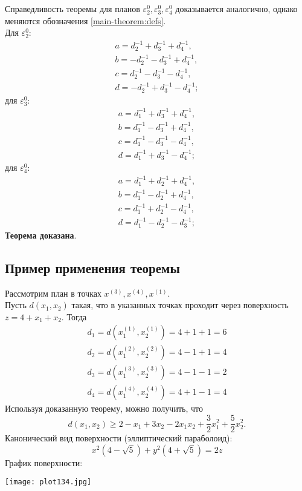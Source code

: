 	Справедливость теоремы для планов $\varepsilon_2^0, \varepsilon_3^0,\varepsilon_4^0$ доказывается аналогично, однако меняются обозначения \eqref{main-theorem:defs}.\\ Для $\varepsilon_2^0$:
		\begin{equation*} \begin{split}
			a=d_2^{-1}+d_3^{-1}+d_4^{-1},\\
			b=-d_2^{-1}-d_3^{-1}+d_4^{-1},\\
			c=d_2^{-1}-d_3^{-1}-d_4^{-1},\\
			d=-d_2^{-1}+d_3^{-1}-d_4^{-1};
		\end{split}\end{equation*}
	для $\varepsilon_3^0$:
		\begin{equation*} \begin{split}
			a=d_1^{-1}+d_3^{-1}+d_4^{-1},\\
			b=d_1^{-1}-d_3^{-1}+d_4^{-1},\\
			c=d_1^{-1}-d_3^{-1}-d_4^{-1},\\
			d=d_1^{-1}+d_3^{-1}-d_4^{-1};
		\end{split}\end{equation*}
	для $\varepsilon_4^0$:
		\begin{equation*} \begin{split}
			a=d_1^{-1}+d_2^{-1}+d_4^{-1},\\
			b=d_1^{-1}-d_2^{-1}+d_4^{-1},\\
			c=d_1^{-1}+d_2^{-1}-d_4^{-1},\\
			d=d_1^{-1}-d_2^{-1}-d_3^{-1};
		\end{split}\end{equation*}
	\textbf{Теорема доказана}.
			
	
\subsection{Пример применения теоремы}
	Рассмотрим план в точках $x^{(3)}, x^{(4)}, x^{(1)}$.\\
	Пусть $d(x_1, x_2)$ такая, что в указанных точках проходит через поверхность $z = 4 + x_1 + x_2$.
	Тогда
	\begin{gather*}
		d_1 = d(x_1^{(1)}, x_2^{(1)}) = 4 + 1 + 1 = 6 \\
		d_2 = d(x_1^{(2)}, x_2^{(2)}) = 4 -1 + 1 = 4 \\
		d_3 = d(x_1^{(3)}, x_2^{(3)}) = 4 -1 - 1 = 2 \\
		d_4 = d(x_1^{(4)}, x_2^{(4)}) = 4 + 1 - 1 = 4
	\end{gather*}
	Используя доказанную теорему, можно получить, что
		$$d(x_1, x_2) \ge 2 - x_1 + 3x_2 -2x_1x_2 +\frac{3}{2}x_1^2 + \frac 5 2 x_2^2.$$
	Канонический вид поверхности (эллиптический параболоид):\\
		$$x^2 (4 - \sqrt{5}) + y^2 (4 + \sqrt 5) = 2z$$
	График поверхности:\\
		\begin{center}\texttt{[image: plot134.jpg]}\end{center}
		
